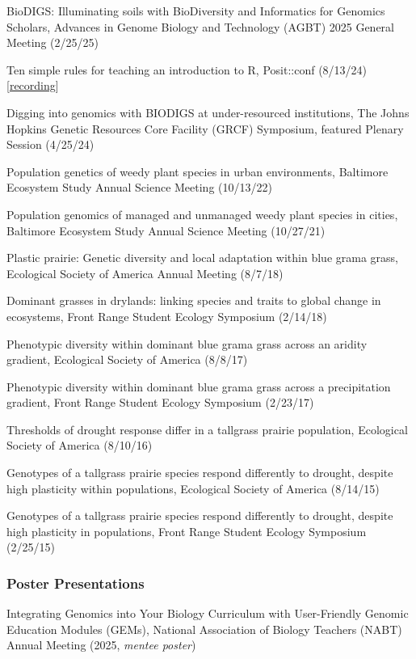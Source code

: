 \documentclass{cv}
\begin{document}
BioDIGS: Illuminating soils with BioDiversity and Informatics for Genomics Scholars, Advances in Genome Biology and Technology (AGBT) 2025 General Meeting (2/25/25)

Ten simple rules for teaching an introduction to R, Posit::conf (8/13/24) [\href{https://youtu.be/wIt-ypW-a4M?si=VNdVhDTlGUkqGPHb}{recording}]

Digging into genomics with BIODIGS at under-resourced institutions, The Johns Hopkins Genetic Resources Core Facility (GRCF) Symposium, featured Plenary Session (4/25/24)

Population genetics of weedy plant species in urban environments, Baltimore Ecosystem Study Annual Science Meeting (10/13/22)

Population genomics of managed and unmanaged weedy plant species in cities, Baltimore Ecosystem Study Annual Science Meeting (10/27/21)

Plastic prairie: Genetic diversity and local adaptation within blue grama grass, Ecological Society of America Annual Meeting (8/7/18)

Dominant grasses in drylands: linking species and traits to global change in ecosystems, Front Range Student Ecology Symposium (2/14/18)

Phenotypic diversity within dominant blue grama grass across an aridity gradient, Ecological Society of America (8/8/17)

Phenotypic diversity within dominant blue grama grass across a precipitation gradient, Front Range Student Ecology Symposium (2/23/17)

Thresholds of drought response differ in a tallgrass prairie population, Ecological Society of America (8/10/16)

Genotypes of a tallgrass prairie species respond differently to drought, despite high plasticity within populations, Ecological Society of America (8/14/15)

Genotypes of a tallgrass prairie species respond differently to drought, despite high plasticity in populations, Front Range Student Ecology Symposium (2/25/15)

\subsubsection*{Poster Presentations}

Integrating Genomics into Your Biology Curriculum with User-Friendly Genomic Education Modules (GEMs), National Association of Biology Teachers (NABT) Annual Meeting (2025, \textit{mentee poster})
\end{document}
